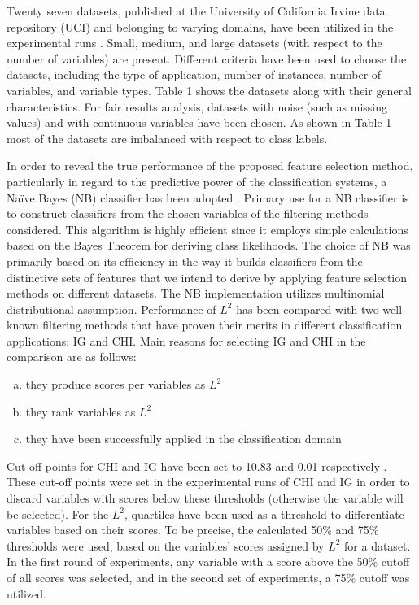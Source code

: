 \documentclass[review]{elsarticle}
\begin{document}
Twenty seven datasets, published at the University of California Irvine data repository (UCI) and belonging to varying domains, have been utilized in the experimental runs \cite{Asuncion2007}. Small, medium, and large datasets (with respect to the number of variables) are present. Different criteria have been used to choose the datasets, including the type of application, number of instances, number of variables, and variable types. Table 1 shows the datasets along with their general characteristics.  For fair results analysis, datasets with noise (such as missing values) and with continuous variables have been chosen. As shown in Table 1 most of the datasets are imbalanced with respect to class labels.

In order to reveal the true performance of the proposed feature selection method, particularly in regard to the predictive power of the classification systems, a Naïve Bayes (NB) classifier has been adopted \cite{Hand2001}. Primary use for a NB classifier is to construct classifiers from the chosen variables of the filtering methods considered. This algorithm is highly efficient since it employs simple calculations based on the Bayes Theorem for deriving class likelihoods. The choice of NB was primarily based on its efficiency in the way it builds classifiers from the distinctive sets of features that we intend to derive by applying feature selection methods on different datasets. The NB implementation utilizes multinomial distributional assumption. Performance of $ L^2 $ has been compared with two well-known filtering methods that have proven their merits in different classification applications: IG and CHI. Main reasons for selecting IG and CHI in the comparison are as follows:

\begin{enumerate}[(a)]
	\item they produce scores per variables as $ L^2 $
	\item they rank variables as $ L^2 $
	\item they have been successfully applied in the classification domain
	
\end{enumerate}

Cut-off points for CHI and IG have been set to 10.83 and 0.01 respectively \cite{Kamalov2017, Liu1995}. These cut-off points were set in the experimental runs of CHI and IG in order to discard variables with scores below these thresholds (otherwise the variable will be selected). For the $ L^2 $, quartiles have been used as a threshold to differentiate variables based on their scores. To be precise, the calculated 50\% and 75\% thresholds were used, based on the variables’ scores assigned by $ L^2 $ for a dataset. In the first round of experiments, any variable with a score above the 50\% cutoff of all scores was selected, and in the second set of experiments, a 75\% cutoff was utilized.  
\end{document}
